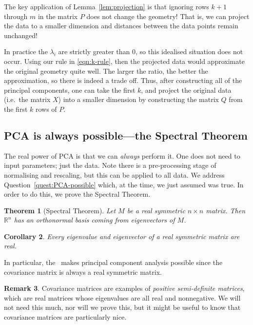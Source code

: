 \documentclass[a4paper, 12pt]{article}
\numberwithin{equation}{section}
\numberwithin{figure}{section}
\newtheorem{thm}{Theorem}[section]
\newtheorem{cor}[thm]{Corollary}
\theoremstyle{definition}
\newtheorem{remark}[thm]{Remark}
\newcommand{\R}{\mathbb{R}}
\begin{document}
The key application of Lemma~\ref{lem:projection} is that ignoring rows $k+1$ through
$m$ in the matrix $P$ does not change the geometry! That is, we can project the
data to a smaller dimension and distances between the data points remain
unchanged! 

In practice the $\lambda_i$ are strictly greater than $0$, so this idealised
situation does not occur. Using our rule in \eqref{eqn:k-rule}, then the
projected data would approximate the original geometry quite well. The larger
the ratio, the better the approximation, so there is indeed a trade off. Thus,
after constructing all of the principal components, one can take the first $k$,
and project the original data (i.e.\ the matrix $X$) into a smaller dimension by
constructing the matrix $Q$ from the first $k$ rows of $P$. 

\subsection{PCA is always possible---the Spectral Theorem}

The real power of PCA is that we can \textit{always} perform it. One does not
need to input parameters; just the data. Note there is a pre-processing stage of
normalising and rescaling, but this can be applied to all data. We address
Question~\ref{quest:PCA-possible} which, at the time, we just assumed was true. In order
to do this, we prove the Spectral Theorem.

\begin{thm}[Spectral Theorem]\label{thm:spectral-thm}
	Let $M$ be a real symmetric $n\times n$ matrix. Then $\R^n$ has an
	orthonormal basis coming from eigenvectors of $M$. 
\end{thm}

\begin{cor}
	Every eigenvalue and eigenvector of a real symmetric matrix are real.
\end{cor}

In particular, the~ makes principal component analysis
possible since the covariance matrix is always a real symmetric matrix. 

\begin{remark}
	Covariance matrices are examples of \textit{positive semi-definite
	matrices}, which are real matrices whose eigenvalues are all real and
	nonnegative. We will not need this much, nor will we prove this, but it
	might be useful to know that covariance matrices are particularly nice.
\end{remark}
\end{document}
